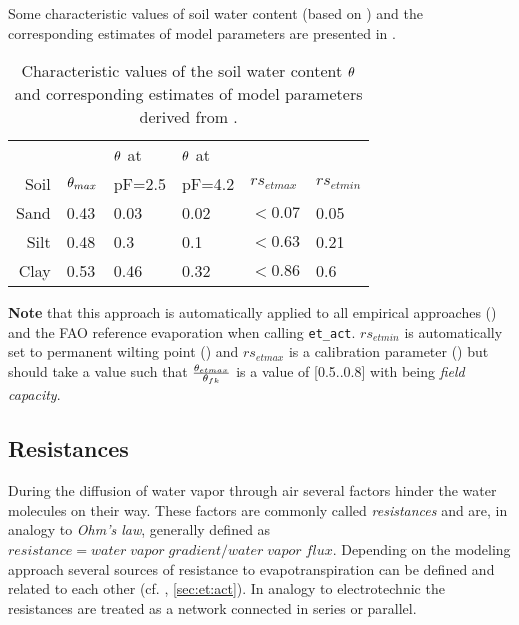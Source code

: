 Some characteristic values of soil water content (based on ) and the corresponding estimates of model parameters are presented in .

\begin{table}
  \caption{Characteristic values of the soil water content $\theta$ and corresponding estimates of model parameters derived from . \label{tab:eta:soilmoisture}}
  {\small
  \begin{tabular}{|rlllll|} \hline
    \rowcolor[gray]{0.9}
         &                        & $\theta$ at & $\theta$ at & & \\
    \rowcolor[gray]{0.9}
    Soil & $\theta_{max}$ & pF=2.5 & pF=4.2 & $rs_{et max}$ & $rs_{et min}$ \\ \hline
    Sand & 0.43 & 0.03 & 0.02 & $< 0.07$ & 0.05 \\
    Silt & 0.48 & 0.3  & 0.1  & $< 0.63$ & 0.21 \\
    Clay & 0.53 & 0.46 & 0.32 & $< 0.86$ & 0.6 \\
  \hline
  \end{tabular} 
  }
\end{table}

\textbf{Note} that this approach is automatically applied to all empirical approaches () and the FAO reference evaporation when calling \verb!et_act!. $rs_{et min}$ is automatically set to permanent wilting point (\waterContPwp{}) and $rs_{et max}$ is a calibration parameter (\waterContEtmax{}) but should take a value such that $\frac{\theta_{etmax}}{\theta_{fk}}$ is a value of [\num{0.5}..\num{0.8}] with \waterContFK{} being \emph{field capacity}.




\subsection{Resistances} \label{sec:et:resist}
During the diffusion of water vapor through air several factors hinder the water molecules on their way. These factors are commonly called \emph{resistances} and are, in analogy to \emph{Ohm's law}, generally defined as $resistance = water \; vapor \; gradient / water \; vapor \; flux$. Depending on the modeling approach several sources of resistance to evapotranspiration can be defined and related to each other (cf. , \ref{sec:et:act}). In analogy to electrotechnic the resistances are treated as a network connected in series or parallel.


